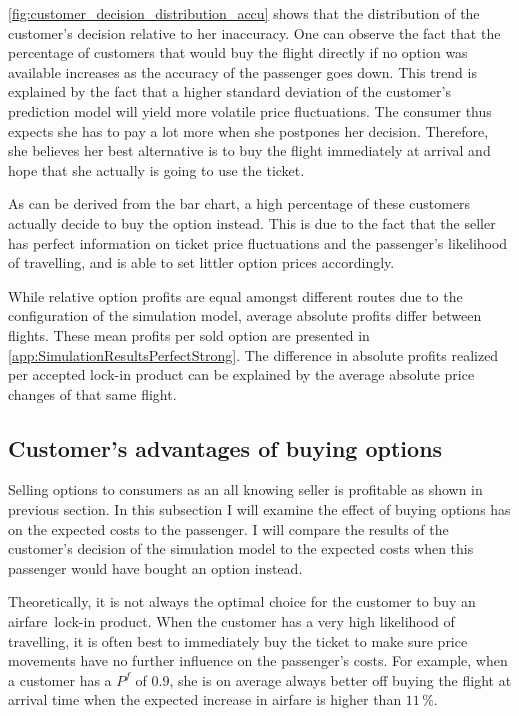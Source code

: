 \autoref{fig:customer_decision_distribution_accu} shows that the distribution of the customer's decision relative to her inaccuracy. One can observe the fact that the percentage of customers that would buy the flight directly if no option was available increases as the accuracy of the passenger goes down. This trend is explained by the fact that a higher standard deviation of the customer's prediction model will yield more volatile price fluctuations. The consumer thus expects she has to pay a lot more when she postpones her decision. Therefore, she believes her best alternative is to buy the flight immediately at arrival and hope that she actually is going to use the ticket.

As can be derived from the bar chart, a high percentage of these customers actually decide to buy the option instead. This is due to the fact that the seller has perfect information on ticket price fluctuations and the passenger's likelihood of travelling, and is able to set littler option prices accordingly.


While relative option profits are equal amongst different routes due to the configuration of the simulation model, average absolute profits differ between flights. These mean profits per sold option are presented in \autoref{app:SimulationResultsPerfectStrong}. The difference in absolute profits realized per accepted lock-in product can be explained by the average absolute price changes of that same flight.


\subsection{Customer's advantages of buying options}
Selling options to consumers as an all knowing seller is profitable as shown in previous section. In this subsection I will examine the effect of buying options has on the expected costs to the passenger. I will compare the results of the customer's decision of the simulation model to the expected costs when this passenger would have bought an option instead.

Theoretically, it is not always the optimal choice for the customer to buy an airfare~lock-in product. When the customer has a very high likelihood of travelling, it is often best to immediately buy the ticket to make sure price movements have no further influence on the passenger's costs. For example, when a customer has a $P^f$ of $0.9$, she is on average always better off buying the flight at arrival time when the expected increase in airfare is higher than $11\,\%$.

